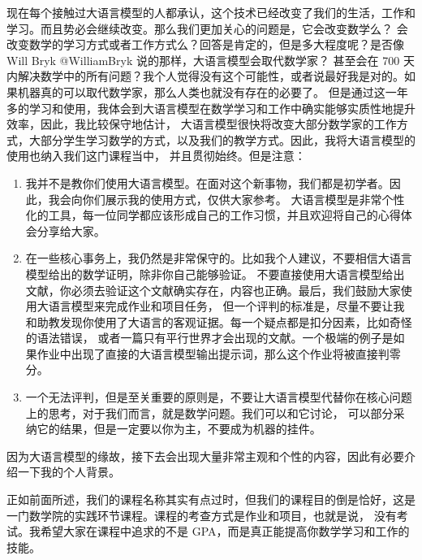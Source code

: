 \documentclass{ctexbook}
\numberwithin{theorem}{chapter}
\begin{document}
现在每个接触过大语言模型的人都承认，这个技术已经改变了我们的生活，工作和学习。而且势必会继续改变。那么我们更加关心的问题是，它会改变数学么？
会改变数学的学习方式或者工作方式么？回答是肯定的，但是多大程度呢？是否像 Will Bryk @WilliamBryk 说的那样，大语言模型会取代数学家？
甚至会在 700 天内解决数学中的所有问题？我个人觉得没有这个可能性，或者说最好我是对的。如果机器真的可以取代数学家，那么人类也就没有存在的必要了。
但是通过这一年多的学习和使用，我体会到大语言模型在数学学习和工作中确实能够实质性地提升效率，因此，我比较保守地估计，
大语言模型很快将改变大部分数学家的工作方式，大部分学生学习数学的方式，以及我们的教学方式。因此，我将大语言模型的使用也纳入我们这门课程当中，
并且贯彻始终。但是注意：
\begin{enumerate}
  \item 我并不是教你们使用大语言模型。在面对这个新事物，我们都是初学者。因此，我会向你们展示我的使用方式，仅供大家参考。
  大语言模型是非常个性化的工具，每一位同学都应该形成自己的工作习惯，并且欢迎将自己的心得体会分享给大家。
  \item 在一些核心事务上，我仍然是非常保守的。比如我个人建议，不要相信大语言模型给出的数学证明，除非你自己能够验证。
  不要直接使用大语言模型给出文献，你必须去验证这个文献确实存在，内容也正确。最后，我们鼓励大家使用大语言模型来完成作业和项目任务，
  但一个评判的标准是，尽量不要让我和助教发现你使用了大语言的客观证据。每一个疑点都是扣分因素，比如奇怪的语法错误，
  或者一篇只有平行世界才会出现的文献。一个极端的例子是如果作业中出现了直接的大语言模型输出提示词，那么这个作业将被直接判零分。
  \item 一个无法评判，但是至关重要的原则是，不要让大语言模型代替你在核心问题上的思考，对于我们而言，就是数学问题。我们可以和它讨论，
  可以部分采纳它的结果，但是一定要以你为主，不要成为机器的挂件。
\end{enumerate}

因为大语言模型的缘故，接下去会出现大量非常主观和个性的内容，因此有必要介绍一下我的个人背景。

正如前面所述，我们的课程名称其实有点过时，但我们的课程目的倒是恰好，这是一门数学院的实践环节课程。课程的考查方式是作业和项目，也就是说，
没有考试。我希望大家在课程中追求的不是 GPA，而是真正能提高你数学学习和工作的技能。
\end{document}
